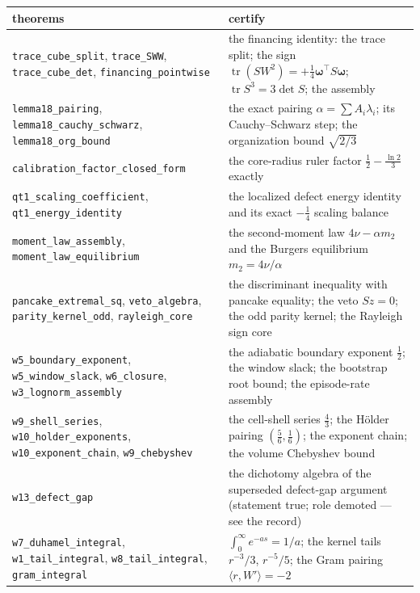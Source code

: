 \documentclass[11pt,letterpaper]{amsart}
\theoremstyle{definition}
\theoremstyle{remark}
\newcommand{\vort}{\boldsymbol{\omega}}
\begin{document}
{\footnotesize
\setlength\LTleft{0pt}\setlength{}
\begin{longtable}{@{}>{\raggedright\arraybackslash}p{}p{}@{}}
\toprule
theorems & certify \\
\midrule
\endhead
\texttt{trace\_cube\_split}, \texttt{trace\_SWW}, \texttt{trace\_cube\_det},
\texttt{financing\_pointwise} & the financing identity: the trace split; the sign
$\operatorname{tr}(SW^2)=+\tfrac14\vort^{\top}S\vort$;
$\operatorname{tr}S^3=3\det S$; the assembly \\
\texttt{lemma18\_pairing}, \texttt{lemma18\_cauchy\_schwarz},
\texttt{lemma18\_org\_bound} & the exact pairing $\alpha=\sum A_i\lambda_i$; its
Cauchy--Schwarz step; the organization bound $\sqrt{2/3}$ \\
\texttt{calibration\_factor\_closed\_form} & the core-radius ruler factor
$\tfrac12-\tfrac{\ln2}{3}$ exactly \\
\texttt{qt1\_scaling\_coefficient}, \texttt{qt1\_energy\_identity} & the localized
defect energy identity and its exact $-\tfrac14$ scaling balance \\
\texttt{moment\_law\_assembly}, \texttt{moment\_law\_equilibrium} & the second-moment
law $4\nu-\alpha m_2$ and the Burgers equilibrium $m_2=4\nu/\alpha$ \\
\texttt{pancake\_extremal\_sq}, \texttt{veto\_algebra},
\texttt{parity\_kernel\_odd}, \texttt{rayleigh\_core} & the discriminant inequality
with pancake equality; the veto $S\hat z=0$; the odd parity kernel; the Rayleigh sign
core \\
\texttt{w5\_boundary\_exponent}, \texttt{w5\_window\_slack}, \texttt{w6\_closure},
\texttt{w3\_lognorm\_assembly} & the adiabatic boundary exponent $\tfrac12$; the
window slack; the bootstrap root bound; the episode-rate assembly \\
\texttt{w9\_shell\_series}, \texttt{w10\_holder\_exponents},
\texttt{w10\_exponent\_chain}, \texttt{w9\_chebyshev} & the cell-shell series
$\tfrac43$; the H\"older pairing $(\tfrac56,\tfrac16)$; the exponent chain; the
volume Chebyshev bound \\
\texttt{w13\_defect\_gap} & the dichotomy algebra of the superseded defect-gap
argument (statement true; role demoted --- see the record) \\
\texttt{w7\_duhamel\_integral}, \texttt{w1\_tail\_integral},
\texttt{w8\_tail\_integral}, \texttt{gram\_integral} & $\int_0^\infty e^{-as}=1/a$;
the kernel tails $r^{-3}/3$, $r^{-5}/5$; the Gram pairing $\langle r,W'\rangle=-2$ \\

\end{longtable}}
\end{document}
